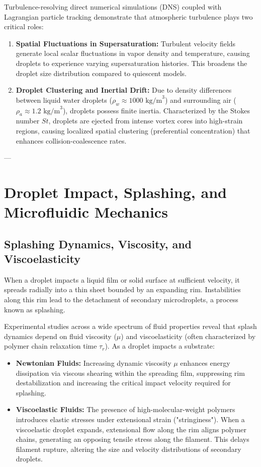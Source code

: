 \documentclass{article}
\begin{document}
Turbulence-resolving direct numerical simulations (DNS) coupled with Lagrangian particle tracking demonstrate that atmospheric turbulence plays two critical roles:
\begin{enumerate}
    \item \textbf{Spatial Fluctuations in Supersaturation:} Turbulent velocity fields generate local scalar fluctuations in vapor density and temperature, causing droplets to experience varying supersaturation histories. This broadens the droplet size distribution compared to quiescent models.
    \item \textbf{Droplet Clustering and Inertial Drift:} Due to density differences between liquid water droplets ($\rho_w \approx 1000 \text{ kg/m}^3$) and surrounding air ($\rho_a \approx 1.2 \text{ kg/m}^3$), droplets possess finite inertia. Characterized by the Stokes number $St$, droplets are ejected from intense vortex cores into high-strain regions, causing localized spatial clustering (preferential concentration) that enhances collision-coalescence rates.
\end{enumerate}

---

\section{Droplet Impact, Splashing, and Microfluidic Mechanics}
\label{sec:splashing_microfluidics}

\subsection{Splashing Dynamics, Viscosity, and Viscoelasticity}
When a droplet impacts a liquid film or solid surface at sufficient velocity, it spreads radially into a thin sheet bounded by an expanding rim. Instabilities along this rim lead to the detachment of secondary microdroplets, a process known as splashing.

Experimental studies across a wide spectrum of fluid properties reveal that splash dynamics depend on fluid viscosity ($\mu$) and viscoelasticity (often characterized by polymer chain relaxation time $\tau_r$). As a droplet impacts a substrate:
\begin{itemize}
    \item \textbf{Newtonian Fluids:} Increasing dynamic viscosity $\mu$ enhances energy dissipation via viscous shearing within the spreading film, suppressing rim destabilization and increasing the critical impact velocity required for splashing.
    \item \textbf{Viscoelastic Fluids:} The presence of high-molecular-weight polymers introduces elastic stresses under extensional strain ("stringiness"). When a viscoelastic droplet expands, extensional flow along the rim aligns polymer chains, generating an opposing tensile stress along the filament. This delays filament rupture, altering the size and velocity distributions of secondary droplets.
\end{itemize}
\end{document}
